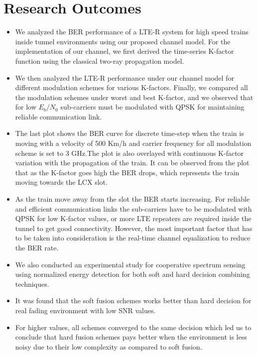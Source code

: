 \section{Research Outcomes}
\begin{itemize}
\item We analyzed the BER performance of a LTE-R system for high speed trains inside tunnel environments using our proposed channel model. For the implementation of our channel, we first derived the time-series K-factor function using the classical two-ray propagation model.

\item We then analyzed the LTE-R performance under our channel model for different modulation schemes for various K-factors. Finally, we compared all the modulation schemes under worst
and best K-factor, and we observed that for low $E_b/N_0$ sub-carriers must be modulated with QPSK for maintaining reliable communication link.

\item The last plot shows the BER curve for discrete time-step when the train is moving with a velocity of 500 Km/h and carrier frequency for all modulation scheme is set to 3 GHz.The plot is also overlayed with continuous K-factor variation with the propagation of the train. It can be observed from the plot that as the K-factor goes high the BER drops, which represents the train moving towards the LCX slot. 

\item As the train move away from the slot the BER starts increasing. For reliable and efficient communication links the sub-carriers have to be modulated with QPSK for low K-factor values, or more LTE repeaters are required inside the tunnel to get good connectivity. However, the most important factor that has to be taken into consideration is the real-time channel equalization to reduce the BER rate.

\item We also conducted an experimental study for cooperative spectrum sensing using normalized energy detection for both soft and hard decision combining techniques.

\item It was found that the soft fusion schemes works better than hard decision for real fading environment with low SNR values.

\item For higher values, all schemes converged to the same decision which led us to conclude that hard fusion schemes pays better when the environment is less noisy due to their low complexity as compared to soft fusion.
\end{itemize}

